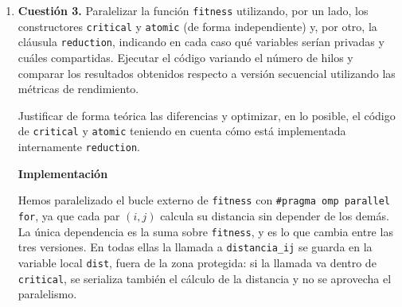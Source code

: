 \documentclass[12pt]{article}
\begin{document}
\begin{enumerate}
En este escenario con $m=1$, el tiempo invertido en el cálculo 
del \texttt{fitness} y en las comprobaciones internas es mínimo,
 provocando que la proporción de llamadas a la función aleatoria 
 respecto al cómputo total sea máxima. Como consecuencia, la versión 
 estática con \texttt{rand()} sufre un colapso acusado por la 
 contención del cerrojo interno (depende de la implementación, consideremos que está presente debido al deterioro con el aumento de hilos) al aumentar el número de hilos
  (pasando de 0.140s con 2 hilos a 0.310s con 12 hilos, empeorando
   incluso el resultado secuencial). Por el contrario, la versión 
   reentrante con \texttt{rand\_r()} aprovecha al máximo la paralelización, r
   educiendo de manera continua el tiempo desde los 0.154s hasta los 0.026s 
   con 12 hilos ($S_{12} = 5.92$).

\medskip
\noindent\textbf{Conclusión}\par
\smallskip

Usar \texttt{rand\_r()} con una semilla privada por hilo evita por completo la serialización impuesta por \texttt{rand()} y permite una aceleración efectiva al incrementar el número de hilos. La ventaja de la implementación reentrante es especialmente drástica en entornos donde el coste computacional propio de cada individuo es reducido ($m=1$), ya que en estos casos la generación aleatoria constituye el mayor cuello de botella de la región paralela.


\newpage

\item \textbf{Cuestión 3.} Paralelizar la función \texttt{fitness} utilizando, por un lado, los constructores \texttt{critical} y \texttt{atomic} (de forma independiente) y, por otro, la cláusula \texttt{reduction}, indicando en cada caso qué variables serían privadas y cuáles compartidas. Ejecutar el código variando el número de hilos y comparar los resultados obtenidos respecto a versión secuencial utilizando las métricas de rendimiento.

Justificar de forma teórica las diferencias y optimizar, en lo posible, el código de \texttt{critical} y \texttt{atomic} teniendo en cuenta cómo está implementada internamente \texttt{reduction}.


\medskip
\noindent\textbf{Implementación}\par
\smallskip

Hemos paralelizado el bucle externo de \texttt{fitness} con \texttt{\#pragma omp parallel for}, ya que cada par $(i,j)$ calcula su distancia sin depender de los demás. La única dependencia es la suma sobre \texttt{fitness}, y es lo que cambia entre las tres versiones. En todas ellas la llamada a \texttt{distancia\_ij} se guarda en la variable local \texttt{dist}, fuera de la zona protegida: si la llamada va dentro de \texttt{critical}, se serializa también el cálculo de la distancia y no se aprovecha el paralelismo.


\end{enumerate}
\end{document}
